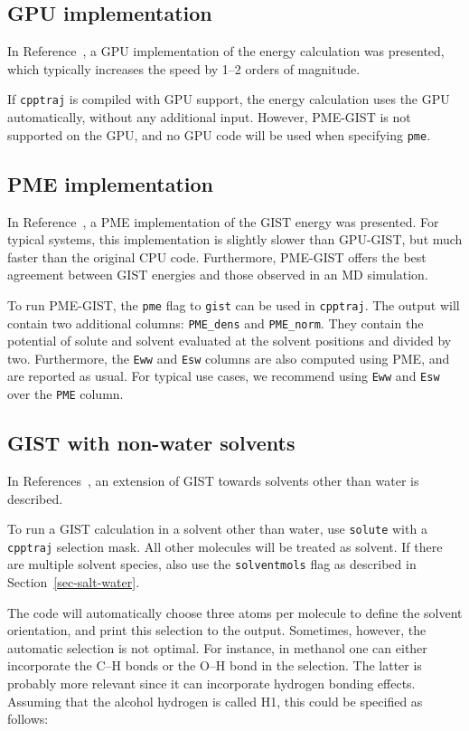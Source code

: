 \documentclass[9pt,tutorial]{livecoms}
\newcommand{\software}{\texttt}
\newcommand\inlinecode{\texttt}
\begin{document}
\subsection{GPU implementation}
In Reference~\cite{Kraml2020}, a GPU implementation of the energy calculation was presented, which typically increases the speed by 1--2 orders of magnitude.

If \software{cpptraj} is compiled with GPU support, the energy calculation uses the GPU automatically, without any additional input.
However, PME-GIST is not supported on the GPU, and no GPU code will be used when specifying \inlinecode{pme}.

\subsection{PME implementation}
In Reference~\cite{Chen2021}, a PME implementation of the GIST energy was presented.
For typical systems, this implementation is slightly slower than GPU-GIST, but much faster than the original CPU code.
Furthermore, PME-GIST offers the best agreement between GIST energies and those observed in an MD simulation.

To run PME-GIST, the \inlinecode{pme} flag to \inlinecode{gist} can be used in \software{cpptraj}.
The output will contain two additional columns: \inlinecode{PME\_dens} and \inlinecode{PME\_norm}.
They contain the potential of solute and solvent evaluated at the solvent positions and divided by two.
Furthermore, the \inlinecode{Eww} and \inlinecode{Esw} columns are also computed using PME, and are reported as usual.
For typical use cases, we recommend using \inlinecode{Eww} and \inlinecode{Esw} over the \inlinecode{PME} column.

\subsection{GIST with non-water solvents}
In References~\cite{Kraml2020,Kamenik2020-gist-macrocycles,Waibl2022-gist-solvents}, an extension of GIST towards solvents other than water is described.

To run a GIST calculation in a solvent other than water, use \inlinecode{solute} with a \software{cpptraj} selection mask.
All other molecules will be treated as solvent.
If there are multiple solvent species, also use the \inlinecode{solventmols} flag as described in Section~\ref{sec-salt-water}.

The code will automatically choose three atoms per molecule to define the solvent orientation, and print this selection to the output.
Sometimes, however, the automatic selection is not optimal.
For instance, in methanol one can either incorporate the C--H bonds or the O--H bond in the selection.
The latter is probably more relevant since it can incorporate hydrogen bonding effects.
Assuming that the alcohol hydrogen is called H1, this could be specified as follows:
\end{document}
